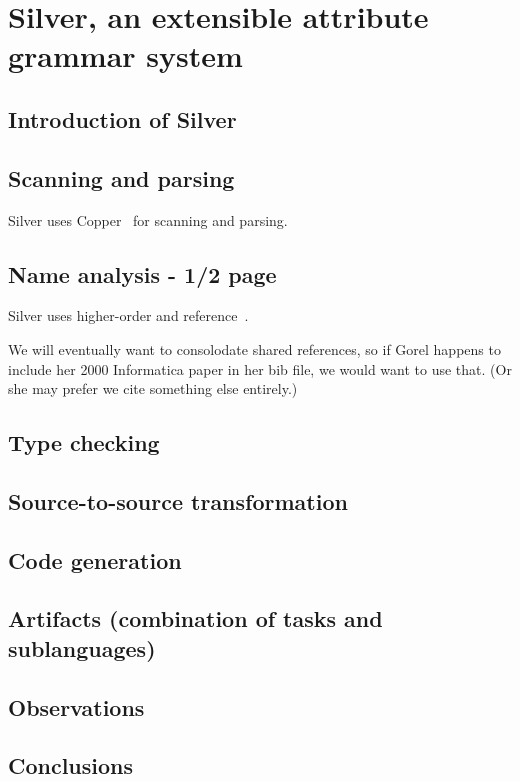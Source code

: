 \section{Silver, an extensible attribute grammar system}

\subsection{Introduction of Silver}

\subsection{Scanning and parsing}

Silver uses Copper~\cite{vanwyk07gpce,schwerdfeger09pldi} for
scanning and parsing.

\subsection{Name analysis - 1/2 page}

Silver uses higher-order and reference~\cite{hedin00informatica}.

We will eventually want to consolodate shared references, so if Gorel
happens to include her 2000 Informatica paper in her bib file, we would want
to use that.  (Or she may prefer we cite something else entirely.)

\subsection{Type checking}

\subsection{Source-to-source transformation}

\subsection{Code generation}

\subsection{Artifacts (combination of tasks and sublanguages)}

\subsection{Observations}

\subsection{Conclusions}
